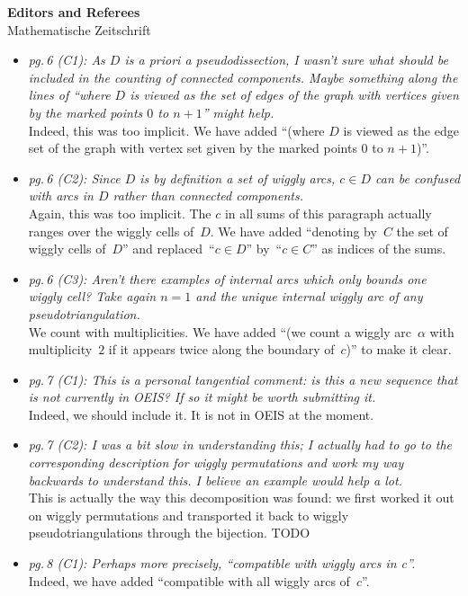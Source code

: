 \documentclass{letter}
\begin{document}
\begin{letter}{{\bf Editors and Referees} \\ Mathematische Zeitschrift}
\begin{itemize}
\item \textsl{\color{gray} pg.\,6 (C1): As $D$ is a priori a pseudodissection, I wasn't sure what should be included in the counting of connected components. Maybe something along the lines of ``where $D$ is viewed as the set of edges of the graph with vertices given by the marked points $0$ to $n+1$'' might help.} \\
Indeed, this was too implicit. We have added ``(where $D$ is viewed as the edge set of the graph with vertex set given by the marked points $0$ to $n+1$)''.

\item \textsl{\color{gray} pg.\,6 (C2): Since $D$ is by definition a set of wiggly arcs, $c \in D$ can be confused with arcs in $D$ rather than connected components.} \\
Again, this was too implicit. The $c$ in all sums of this paragraph actually ranges over the wiggly cells of~$D$. We have added ``denoting by~$C$ the set of wiggly cells of~$D$'' and replaced~``$c \in D$'' by~``$c \in C$'' as indices of the sums.

\item \textsl{\color{gray} pg.\,6 (C3): Aren’t there examples of internal arcs which only bounds one wiggly cell? Take again $n = 1$ and the unique internal wiggly arc of any pseudotriangulation.} \\
We count with multiplicities. We have added ``(we count a wiggly arc~$\alpha$ with multiplicity~$2$ if it appears twice along the boundary of~$c$)'' to make it clear.

\item \textsl{\color{gray} pg.\,7 (C1): This is a personal tangential comment: is this a new sequence that is not currently in OEIS? If so it might be worth submitting it.} \\
Indeed, we should include it. It is not in OEIS at the moment.

\item \textsl{\color{gray} pg.\,7 (C2): I was a bit slow in understanding this; I actually had to go to the corresponding description for wiggly permutations and work my way backwards to understand this. I believe an example would help a lot.} \\
This is actually the way this decomposition was found: we first worked it out on wiggly permutations and transported it back to wiggly pseudotriangulations through the bijection.
TODO

\item \textsl{\color{gray} pg.\,8 (C1): Perhaps more precisely, “compatible with wiggly arcs in c”.} \\
Indeed, we have added ``compatible with all wiggly arcs of~$c$''.


\end{itemize}
\end{letter}
\end{document}
